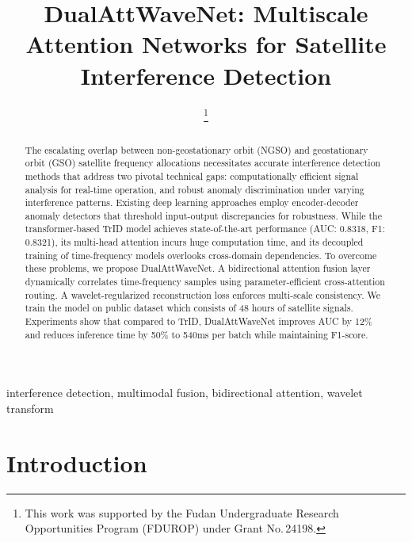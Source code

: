 \documentclass[conference]{IEEEtran}
\begin{document}
\title{DualAttWaveNet: Multiscale Attention Networks for Satellite Interference Detection}

\author{
    \thanks{This work was supported by the Fudan Undergraduate Research Opportunities Program (FDUROP) under Grant No.\,24198.}
}




\maketitle

\begin{abstract}
    The escalating overlap between non-geostationary orbit (NGSO) and geostationary orbit (GSO) satellite frequency allocations necessitates accurate interference detection methods that address two pivotal technical gaps: computationally efficient signal analysis for real-time operation, and robust anomaly discrimination under varying interference patterns.  Existing deep learning approaches employ encoder-decoder anomaly detectors that threshold input-output discrepancies for robustness. While the transformer-based TrID model achieves state-of-the-art performance (AUC: 0.8318, F1: 0.8321), its multi-head attention incurs huge computation time, and its decoupled training of time-frequency models overlooks cross-domain dependencies. To overcome these problems, we propose DualAttWaveNet. A bidirectional attention fusion layer dynamically correlates time-frequency samples using parameter-efficient cross-attention routing. A wavelet-regularized reconstruction loss enforces multi-scale consistency.  We train the model on public dataset which consists of 48 hours of satellite signals. Experiments show that compared to TrID, DualAttWaveNet improves AUC by 12\% and reduces inference time by 50\% to 540ms per batch while maintaining F1-score.
\end{abstract}

\begin{IEEEkeywords}
    interference detection, multimodal fusion, bidirectional attention, wavelet transform
\end{IEEEkeywords}


\section{Introduction}
\label{sec:intro}
\end{document}
